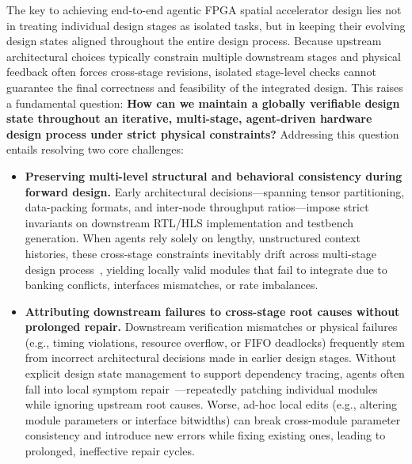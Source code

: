 \documentclass[9pt,conference]{IEEEtran}
\begin{document}
The key to achieving end-to-end agentic FPGA spatial accelerator design lies not in treating individual design stages as isolated tasks, but in keeping their evolving design states aligned throughout the entire design process. Because upstream architectural choices typically constrain multiple downstream stages and physical feedback often forces cross-stage revisions, isolated stage-level checks cannot guarantee the final correctness and feasibility of the integrated design. This raises a fundamental question: \textbf{How can we maintain a globally verifiable design state throughout an iterative, multi-stage, agent-driven hardware design process under strict physical constraints?} Addressing this question entails resolving two core challenges:
\begin{itemize}
\item \textbf{Preserving multi-level structural and behavioral consistency during forward design.} Early architectural decisions—spanning tensor partitioning, data-packing formats, and inter-node throughput ratios—impose strict invariants on downstream RTL/HLS implementation and testbench generation. When agents rely solely on lengthy, unstructured context histories, these cross-stage constraints inevitably drift across multi-stage design process~\cite{lostmiddle,longbench,locomo}, yielding locally valid modules that fail to integrate due to banking conflicts, interfaces mismatches, or rate imbalances.
\item \textbf{Attributing downstream failures to cross-stage root causes without prolonged repair.} Downstream verification mismatches or physical failures (e.g., timing violations, resource overflow, or FIFO deadlocks) frequently stem from incorrect architectural decisions made in earlier design stages. Without explicit design state management to support dependency tracing, agents often fall into local symptom repair~\cite{swesearch}—repeatedly patching individual modules while ignoring upstream root causes. Worse, ad-hoc local edits (e.g., altering module parameters or interface bitwidths) can break cross-module parameter consistency and introduce new errors while fixing existing ones, leading to prolonged, ineffective repair cycles.
\end{itemize}
\end{document}

